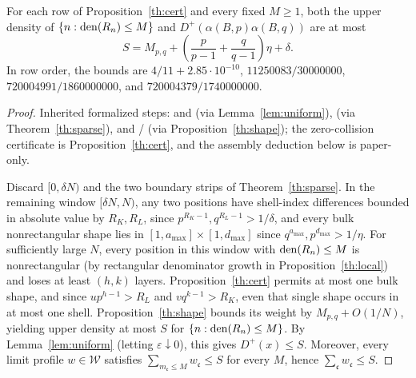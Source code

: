 \documentclass[11pt]{article}
\begin{document}
\begin{corollary}\label{th:examples}
For each row of Proposition~\ref{th:cert} and every fixed $M\ge1$, both the upper density of $\{n:\operatorname{den}(R_n)\le M\}$ and $D^+(\alpha(B,p)\alpha(B,q))$ are at most
\[
 S=M_{p,q}+\left(\frac p{p-1}+\frac q{q-1}\right)\eta+\delta .
\]
In row order, the bounds are $4/11+2.85\cdot10^{-10}$, $11250083/30000000$, $720004991/1860000000$, and $720004379/1740000000$.
\end{corollary}
\begin{proof}
Inherited formalized steps:  and  (via Lemma~\ref{lem:uniform}),  (via Theorem~\ref{th:sparse}), and  /  (via Proposition~\ref{th:shape}); the zero-collision certificate is Proposition~\ref{th:cert}, and the assembly deduction below is paper-only.

Discard $[0,\delta N)$ and the two boundary strips of Theorem~\ref{th:sparse}. In the remaining window $[\delta N,N)$, any two positions have shell-index differences bounded in absolute value by $R_K,R_L$, since $p^{R_K-1},q^{R_L-1}>1/\delta$, and every bulk nonrectangular shape lies in $[1,a_{\max}]\times[1,d_{\max}]$ since $q^{a_{\max}},p^{d_{\max}}>1/\eta$. For sufficiently large $N$, every position in this window with $\operatorname{den}(R_n)\le M$ is nonrectangular (by rectangular denominator growth in Proposition~\ref{th:local}) and loses at least $(h,k)$ layers. Proposition~\ref{th:cert} permits at most one bulk shape, and since $up^{h-1}>R_L$ and $vq^{k-1}>R_K$, even that single shape occurs in at most one shell. Proposition~\ref{th:shape} bounds its weight by $M_{p,q}+O(1/N)$, yielding upper density at most $S$ for $\{n:\operatorname{den}(R_n)\le M\}$. By Lemma~\ref{lem:uniform} (letting $\varepsilon\downarrow0$), this gives $D^+(x)\le S$. Moreover, every limit profile $w\in\mathcal W$ satisfies $\sum_{m_{\mathfrak c}\le M} w_{\mathfrak c}\le S$ for every $M$, hence $\sum_{\mathfrak c} w_{\mathfrak c}\le S$.
\end{proof}
\end{document}
